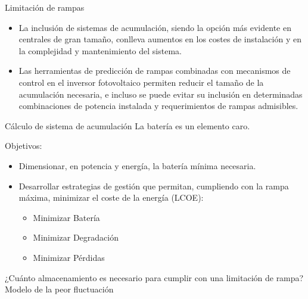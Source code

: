 \documentclass[aspectratio=169, usenames,svgnames,dvipsnames]{beamer}
\begin{document}
\begin{frame}[label={sec:org2f9138b}]{Limitación de rampas}
\begin{itemize}
\item La inclusión de sistemas de acumulación, siendo la opción más
evidente en centrales de gran tamaño, conlleva aumentos en los
costes de instalación y en la complejidad y mantenimiento del
sistema.

\item Las herramientas de predicción de rampas combinadas con mecanismos
de control en el inversor fotovoltaico permiten reducir el tamaño de
la acumulación necesaria, e incluso se puede evitar su inclusión en
determinadas combinaciones de potencia instalada y requerimientos de
rampas admisibles.
\end{itemize}
\end{frame}
\begin{frame}[label={sec:org77e05d2}]{Cálculo de sistema de acumulación}
La batería es un elemento caro.

Objetivos:
\begin{itemize}
\item Dimensionar, en potencia y energía, la batería mínima necesaria.
\item Desarrollar estrategias de gestión que permitan, cumpliendo con la rampa máxima, minimizar el coste de la energía (LCOE):
\begin{itemize}
\item Minimizar Batería
\item Minimizar Degradación
\item Minimizar Pérdidas
\end{itemize}
\end{itemize}

¿Cuánto almacenamiento es necesario para cumplir con una limitación de
rampa? Modelo de la peor fluctuación
\end{frame}
\end{document}
